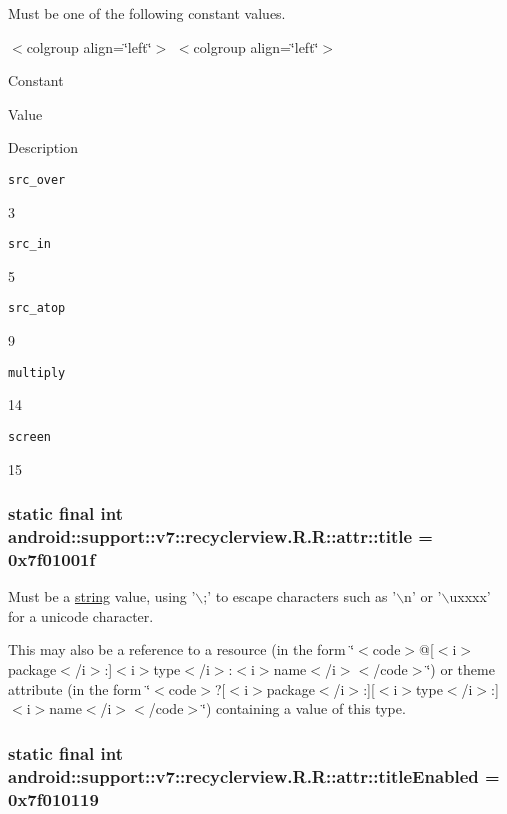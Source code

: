 Must be one of the following constant values. \begin{TabularC}{0}
\hline
\end{TabularC}
$<$colgroup align=\char`\"{}left\char`\"{}$>$ $<$colgroup align=\char`\"{}left\char`\"{}$>$ 

Constant

Value

Description 

{\tt src\_\-over}

3

{\tt src\_\-in}

5

{\tt src\_\-atop}

9

{\tt multiply}

14

{\tt screen}

15\hypertarget{classandroid_1_1support_1_1v7_1_1recyclerview_1_1_r_1_1attr_2af285c58cdcd35f593a77202762eb74}{
\subsubsection[{title}]{\setlength{\rightskip}{0pt plus 5cm}static final int android::support::v7::recyclerview.R.R::attr::title = 0x7f01001f}}
\label{classandroid_1_1support_1_1v7_1_1recyclerview_1_1_r_1_1attr_2af285c58cdcd35f593a77202762eb74}


Must be a \hyperlink{classandroid_1_1support_1_1v7_1_1recyclerview_1_1_r_1_1string}{string} value, using '$\backslash$;' to escape characters such as '$\backslash$n' or '$\backslash$uxxxx' for a unicode character. 

This may also be a reference to a resource (in the form \char`\"{}$<$code$>$@\mbox{[}$<$i$>$package$<$/i$>$:\mbox{]}$<$i$>$type$<$/i$>$:$<$i$>$name$<$/i$>$$<$/code$>$\char`\"{}) or theme attribute (in the form \char`\"{}$<$code$>$?\mbox{[}$<$i$>$package$<$/i$>$:\mbox{]}\mbox{[}$<$i$>$type$<$/i$>$:\mbox{]}$<$i$>$name$<$/i$>$$<$/code$>$\char`\"{}) containing a value of this type. \hypertarget{classandroid_1_1support_1_1v7_1_1recyclerview_1_1_r_1_1attr_6d2feb89d2b0068783c19518659f4c89}{
\subsubsection[{titleEnabled}]{\setlength{\rightskip}{0pt plus 5cm}static final int android::support::v7::recyclerview.R.R::attr::titleEnabled = 0x7f010119}}
\label{classandroid_1_1support_1_1v7_1_1recyclerview_1_1_r_1_1attr_6d2feb89d2b0068783c19518659f4c89}


